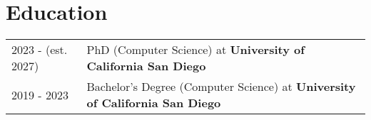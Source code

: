 \section{Education}
\begin{tabularx}{\linewidth}{@{}l X@{}}
	2023 - (est. 2027) & PhD (Computer Science) at \textbf{University of California San Diego}               \\
	2019 - 2023        & Bachelor's Degree (Computer Science) at \textbf{University of California San Diego} \\
\end{tabularx}
